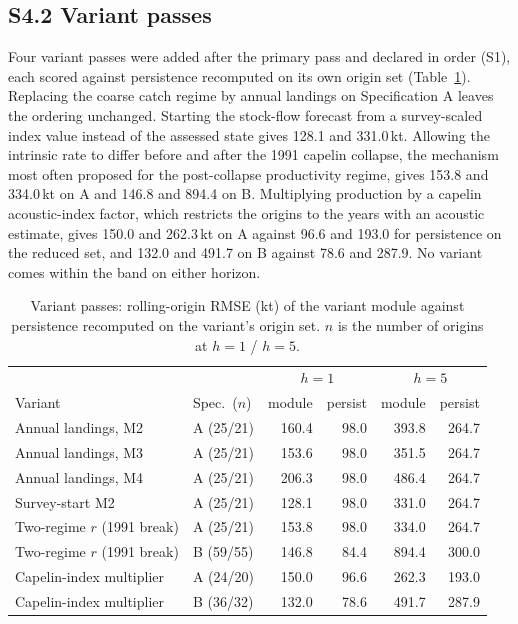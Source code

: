 \FloatBarrier
\subsection*{S4.2 Variant passes}

Four variant passes were added after the primary pass and declared in order (S1), each scored against persistence recomputed on its own origin set (Table~\ref{tab:si_variants}). Replacing the coarse catch regime by annual landings on Specification A leaves the ordering unchanged. Starting the stock-flow forecast from a survey-scaled index value instead of the assessed state gives 128.1 and 331.0\,kt. Allowing the intrinsic rate to differ before and after the 1991 capelin collapse, the mechanism most often proposed for the post-collapse productivity regime, gives 153.8 and 334.0\,kt on A and 146.8 and 894.4 on B. Multiplying production by a capelin acoustic-index factor, which restricts the origins to the years with an acoustic estimate, gives 150.0 and 262.3\,kt on A against 96.6 and 193.0 for persistence on the reduced set, and 132.0 and 491.7 on B against 78.6 and 287.9. No variant comes within the band on either horizon.

\begin{table}[!htb]
\centering\small
\caption{Variant passes: rolling-origin RMSE (kt) of the variant module against persistence recomputed on the variant's origin set. $n$ is the number of origins at $h=1$ / $h=5$.}
\label{tab:si_variants}
\begin{tabular}{@{}llrrrr@{}}
\toprule
 & & \multicolumn{2}{c}{$h=1$} & \multicolumn{2}{c}{$h=5$} \\
Variant & Spec.\ ($n$) & module & persist & module & persist \\
\midrule
Annual landings, M2 & A (25/21) & 160.4 & 98.0 & 393.8 & 264.7 \\
Annual landings, M3 & A (25/21) & 153.6 & 98.0 & 351.5 & 264.7 \\
Annual landings, M4 & A (25/21) & 206.3 & 98.0 & 486.4 & 264.7 \\
Survey-start M2 & A (25/21) & 128.1 & 98.0 & 331.0 & 264.7 \\
Two-regime $r$ (1991 break) & A (25/21) & 153.8 & 98.0 & 334.0 & 264.7 \\
Two-regime $r$ (1991 break) & B (59/55) & 146.8 & 84.4 & 894.4 & 300.0 \\
Capelin-index multiplier & A (24/20) & 150.0 & 96.6 & 262.3 & 193.0 \\
Capelin-index multiplier & B (36/32) & 132.0 & 78.6 & 491.7 & 287.9 \\
\bottomrule
\end{tabular}
\end{table}
